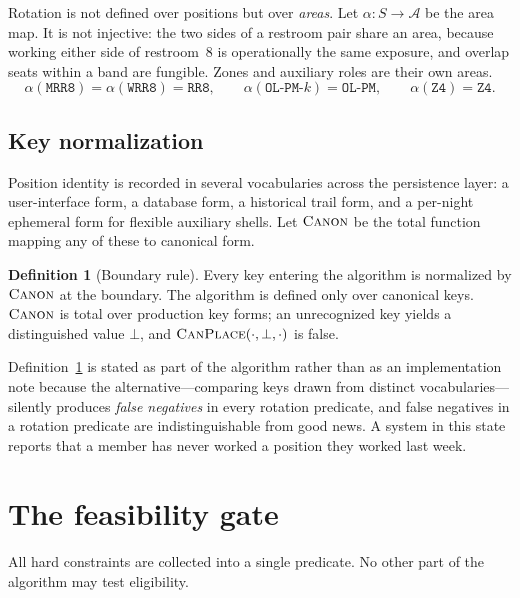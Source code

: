 \documentclass[11pt,a4paper]{article}
\theoremstyle{definition}
\newtheorem{definition}{Definition}
\theoremstyle{remark}
\newcommand{\canplace}{\textsc{CanPlace}}
\newcommand{\canon}{\textsc{Canon}}
\begin{document}
Rotation is not defined over positions but over \emph{areas}. Let
$\alpha : S \to \mathcal{A}$ be the area map. It is not injective: the two
sides of a restroom pair share an area, because working either side of
restroom~8 is operationally the same exposure, and overlap seats within a
band are fungible. Zones and auxiliary roles are their own areas.
\begin{equation}
\alpha(\texttt{MRR8}) = \alpha(\texttt{WRR8}) = \texttt{RR8},
\qquad
\alpha(\texttt{OL-PM-}k) = \texttt{OL-PM},
\qquad
\alpha(\texttt{Z4}) = \texttt{Z4}.
\end{equation}

\subsection{Key normalization}

Position identity is recorded in several vocabularies across the persistence
layer: a user-interface form, a database form, a historical trail form, and
a per-night ephemeral form for flexible auxiliary shells. Let $\canon$ be the
total function mapping any of these to canonical form.

\begin{definition}[Boundary rule]
\label{def:boundary}
Every key entering the algorithm is normalized by $\canon$ at the boundary.
The algorithm is defined only over canonical keys. $\canon$ is total over
production key forms; an unrecognized key yields a distinguished value
$\bot$, and $\canplace(\cdot, \bot, \cdot)$ is false.
\end{definition}

Definition~\ref{def:boundary} is stated as part of the algorithm rather than
as an implementation note because the alternative---comparing keys drawn from
distinct vocabularies---silently produces \emph{false negatives} in every
rotation predicate, and false negatives in a rotation predicate are
indistinguishable from good news. A system in this state reports that a
member has never worked a position they worked last week.

\section{The feasibility gate}
\label{sec:gate}

All hard constraints are collected into a single predicate. No other part of
the algorithm may test eligibility.
\end{document}
